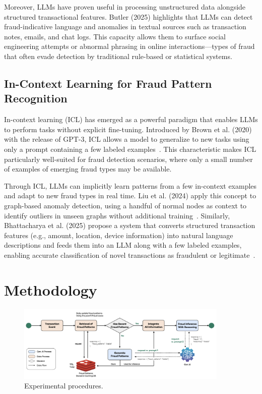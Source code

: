 \documentclass[sigconf]{acmart}
\begin{document}
Moreover, LLMs have proven useful in processing unstructured data alongside structured transactional features. Butler (2025) highlights that LLMs can detect fraud-indicative language and anomalies in textual sources such as transaction notes, emails, and chat logs. This capacity allows them to surface social engineering attempts or abnormal phrasing in online interactions—types of fraud that often evade detection by traditional rule-based or statistical systems.


\subsection{In-Context Learning for Fraud Pattern Recognition}
In-context learning (ICL) has emerged as a powerful paradigm that enables LLMs to perform tasks without explicit fine-tuning. Introduced by Brown et al. (2020) with the release of GPT-3, ICL allows a model to generalize to new tasks using only a prompt containing a few labeled examples~\cite{brown2020llm_fewshot}. This characteristic makes ICL particularly well-suited for fraud detection scenarios, where only a small number of examples of emerging fraud types may be available.

Through ICL, LLMs can implicitly learn patterns from a few in-context examples and adapt to new fraud types in real time. Liu et al. (2024) apply this concept to graph-based anomaly detection, using a handful of normal nodes as context to identify outliers in unseen graphs without additional training~\cite{liu2024anomaly}. Similarly, Bhattacharya et al. (2025) propose a system that converts structured transaction features (e.g., amount, location, device information) into natural language descriptions and feeds them into an LLM along with a few labeled examples, enabling accurate classification of novel transactions as fraudulent or legitimate~\cite{bhattacharya2024fraud}.



\section{Methodology}\label{methodology}


\begin{figure}[t!]
  \centering
  \includegraphics[width=0.9\textwidth]{figures/fig1_process.png}
  \caption{Experimental procedures. 
  }
\label{fig_process}
\end{figure}
\end{document}
